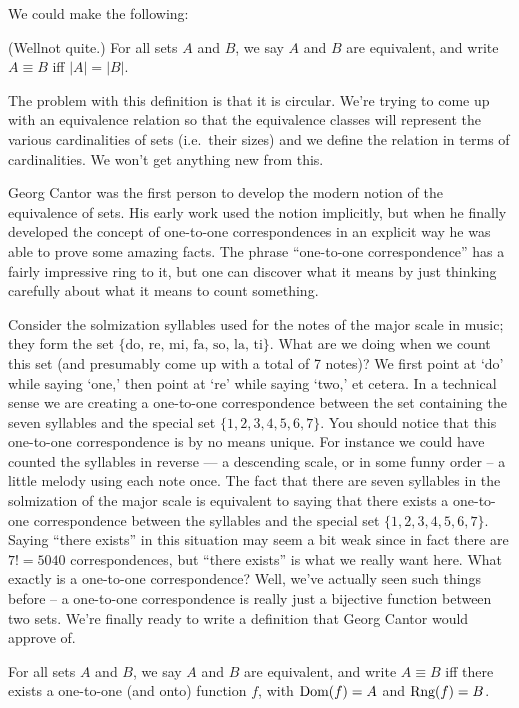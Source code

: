 We could make the following:
\begin{defi}
(Well\textellipsis not quite.) For all sets $A$ and $B$, we say $A$ and $B$ are
equivalent, and write $A \equiv B$ iff $|A| = |B|$.
\end{defi}

The problem with this definition is that it is circular.  We're trying to
come up with an equivalence relation so that the equivalence classes will
represent the various cardinalities of sets (i.e.\ their sizes) and we 
define the relation in terms of cardinalities.  We won't get anything new 
from this.

Georg Cantor was the first person to develop the modern notion of the
equivalence of sets.  His early work used the notion implicitly, but when he
finally developed the concept of one-to-one correspondences in an explicit
way he was able to prove some amazing facts.  The phrase ``one-to-one correspondence''
has a fairly impressive ring to it, but one can discover what it
means by just thinking carefully about what it means to count something.

Consider the solmization syllables used for the notes of the major scale
in music; they form the set $\{\mbox{do, re, mi, fa, so, la, ti}\}$. 
What are we doing when
we count this set (and presumably come up with a total of 7 notes)? We first
point at `do' while saying `one,' then point at `re' while saying `two,' 
et cetera.
In a technical sense we are creating a one-to-one correspondence between the
set containing the seven syllables and the special set $\{1, 2, 3, 4, 5, 6, 7\}$.  You should notice that this one-to-one correspondence is by no means unique.  For
instance we could have counted the syllables in reverse --- a descending scale,
or in some funny order -- a little melody using each note once.  The fact that
there are seven syllables in the solmization of the major scale is equivalent
to saying that there exists a one-to-one correspondence between the syllables
and the special set $\{1, 2, 3, 4, 5, 6, 7\}$.  Saying ``there exists'' in this situation may seem a bit weak since in fact there are $7! = 5040$ correspondences, but ``there exists'' is what we really want here.  What exactly is a one-to-one
correspondence? Well, we've actually seen such things before -- a one-to-one
correspondence is really just a bijective function between two sets.  We're
finally ready to write a definition that Georg Cantor would approve of.

\begin{defi}
For all sets $A$ and $B$, we say $A$ and $B$ are equivalent, and write
$A \equiv B$ iff there exists a one-to-one (and onto) function $f$, with $\mbox{Dom}(f) = A$ and $\mbox{Rng}(f) = B$.
\end{defi}

